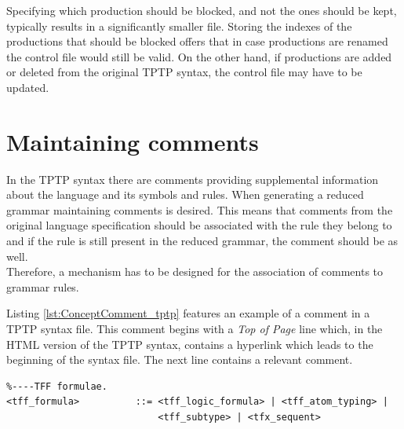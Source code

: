 Specifying which production should be blocked, and not the ones should be kept, typically results in a significantly smaller file.
Storing the indexes of the productions that should be blocked offers that in case productions are renamed the control file would still be valid. On the other hand, if productions are added or deleted from the original \ac{TPTP} syntax, the control file may have to be updated.

\section{Maintaining comments}\label{sec:ConceptMaintainingComments}

In the \ac{TPTP} syntax there are comments providing supplemental information about the language and its symbols and rules.
When generating a reduced grammar maintaining comments is desired. This means that comments from the original language specification should be associated with the rule they belong to and if the rule is still present in the reduced grammar, the comment should be as well.\\
Therefore, a mechanism has to be designed for the association of comments to grammar rules.

Listing \ref{lst:ConceptComment_tptp} features an example of a comment in a \ac{TPTP} syntax file. This comment begins with a \textit{Top of Page} line which, in the HTML version of the \ac{TPTP} syntax, contains a hyperlink which leads to the beginning of the syntax file.
The next line contains a relevant comment.\\
\begin{lstlisting}[language=none, basicstyle=\scriptsize	,caption= Example of a comment in the \ac{TPTP} syntax, label= lst:ConceptComment_tptp]
%----Top of Page---------------------------------------------------------------
%----TFF formulae.
<tff_formula>          ::= <tff_logic_formula> | <tff_atom_typing> |
                           <tff_subtype> | <tfx_sequent>
\end{lstlisting}


